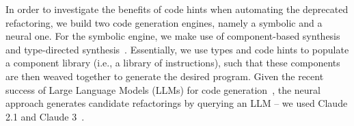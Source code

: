 \documentclass[sigconf,review,anonymous]{acmart}
\begin{document}
In order to investigate the benefits of code hints when automating the deprecated refactoring,
we build two code generation engines, namely a symbolic and a neural one.
%
For the symbolic engine, we make use of component-based synthesis~\cite{DBLP:conf/icse/JhaGST10,DBLP:conf/pldi/GulwaniJTV11,DBLP:conf/popl/FengM0DR17}
and type-directed synthesis~\cite{DBLP:conf/sfp/Katayama05,DBLP:conf/pldi/OseraZ15,DBLP:journals/pacmpl/YamaguchiMDW21}. Essentially, we use types and code hints to populate
a component library (i.e., a library of instructions), such that these components are then weaved together to generate the desired program.
Given the recent success of Large Language Models (LLMs) for code generation~\cite{chen2022codet,DBLP:journals/corr/abs-2108-07732,DBLP:journals/corr/abs-2302-05527,DBLP:journals/corr/abs-2202-13169,llmsforcodecompletion,codegenclasslevel,ni2023lever,zhang2023repocoder,lostintranslation,Ding2024cocomic,yang2024sweagent}, the neural approach 
generates candidate refactorings by querying an LLM -- we used Claude 2.1 and Claude 3~\cite{claude}.

\end{document}
